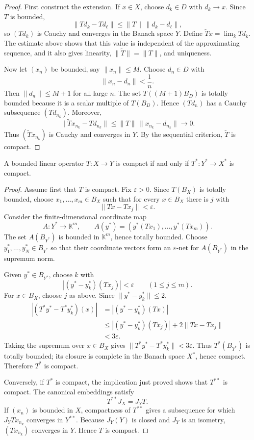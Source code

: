 \begin{proof}
First construct the extension.  If $x\in X$, choose $d_k\in D$ with
$d_k\to x$.  Since $T$ is bounded,
\[
  \|Td_k-Td_\ell\|\le\|T\|\,\|d_k-d_\ell\|,
\]
so $(Td_k)$ is Cauchy and converges in the Banach space $Y$.  Define
$\widetilde Tx=\lim_kTd_k$.  The estimate above shows that this value is
independent of the approximating sequence, and it also gives linearity,
$\|\widetilde T\|=\|T\|$, and uniqueness.

Now let $(x_n)$ be bounded, say $\|x_n\|\le M$.  Choose $d_n\in D$ with
\[
  \|x_n-d_n\|<\frac1n.
\]
Then $\|d_n\|\le M+1$ for all large $n$.  The set
$T((M+1)B_D)$ is totally bounded because it is a scalar multiple of
$T(B_D)$.  Hence $(Td_n)$ has a Cauchy subsequence $(Td_{n_k})$.  Moreover,
\[
  \|\widetilde Tx_{n_k}-Td_{n_k}\|
  \le\|T\|\,\|x_{n_k}-d_{n_k}\|\longrightarrow0.
\]
Thus $(\widetilde Tx_{n_k})$ is Cauchy and converges in $Y$.  By the
sequential criterion, $\widetilde T$ is compact.
\end{proof}

\begin{notetheorem}
A bounded linear operator $T\colon X\to Y$ is compact if and only if
$T^*\colon Y^*\to X^*$ is compact.
\end{notetheorem}

\begin{proof}
Assume first that $T$ is compact.  Fix $\varepsilon>0$.  Since
$T(B_X)$ is totally bounded, choose $x_1,\ldots,x_m\in B_X$ such that for
every $x\in B_X$ there is $j$ with
\[
  \|Tx-Tx_j\|<\varepsilon.
\]
Consider the finite-dimensional coordinate map
\[
  A\colon Y^*\to\mathbb K^m,
  \qquad A(y^*)=(y^*(Tx_1),\ldots,y^*(Tx_m)).
\]
The set $A(B_{Y^*})$ is bounded in $\mathbb K^m$, hence totally bounded.
Choose $y_1^*,\ldots,y_N^*\in B_{Y^*}$ so that their coordinate vectors form
an $\varepsilon$-net for $A(B_{Y^*})$ in the supremum norm.

Given $y^*\in B_{Y^*}$, choose $k$ with
\[
  |(y^*-y_k^*)(Tx_j)|<\varepsilon
  \qquad(1\le j\le m).
\]
For $x\in B_X$, choose $j$ as above.  Since
$\|y^*-y_k^*\|\le2$,
\[
\begin{aligned}
 |(T^*y^*-T^*y_k^*)(x)|
  &=|(y^*-y_k^*)(Tx)|\\
  &\le |(y^*-y_k^*)(Tx_j)|
       +2\|Tx-Tx_j\|\\
  &<3\varepsilon.
\end{aligned}
\]
Taking the supremum over $x\in B_X$ gives
$\|T^*y^*-T^*y_k^*\|<3\varepsilon$.  Thus $T^*(B_{Y^*})$ is totally bounded;
its closure is complete in the Banach space $X^*$, hence compact.  Therefore
$T^*$ is compact.

Conversely, if $T^*$ is compact, the implication just proved shows that
$T^{**}$ is compact.  The canonical embeddings satisfy
\[
  T^{**}J_X=J_YT.
\]
If $(x_n)$ is bounded in $X$, compactness of $T^{**}$ gives a subsequence for
which $J_YTx_{n_k}$ converges in $Y^{**}$.  Because $J_Y(Y)$ is closed and
$J_Y$ is an isometry, $(Tx_{n_k})$ converges in $Y$.  Hence $T$ is compact.
\end{proof}

